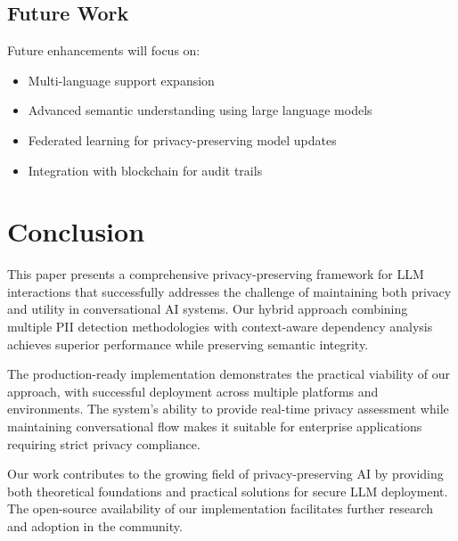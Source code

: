 \documentclass[conference]{IEEEtran}
\begin{document}
\subsection{Future Work}

Future enhancements will focus on:
\begin{itemize}
\item Multi-language support expansion
\item Advanced semantic understanding using large language models
\item Federated learning for privacy-preserving model updates
\item Integration with blockchain for audit trails
\end{itemize}

\section{Conclusion}

This paper presents a comprehensive privacy-preserving framework for LLM interactions that successfully addresses the challenge of maintaining both privacy and utility in conversational AI systems. Our hybrid approach combining multiple PII detection methodologies with context-aware dependency analysis achieves superior performance while preserving semantic integrity.

The production-ready implementation demonstrates the practical viability of our approach, with successful deployment across multiple platforms and environments. The system's ability to provide real-time privacy assessment while maintaining conversational flow makes it suitable for enterprise applications requiring strict privacy compliance.

Our work contributes to the growing field of privacy-preserving AI by providing both theoretical foundations and practical solutions for secure LLM deployment. The open-source availability of our implementation facilitates further research and adoption in the community.
\end{document}
